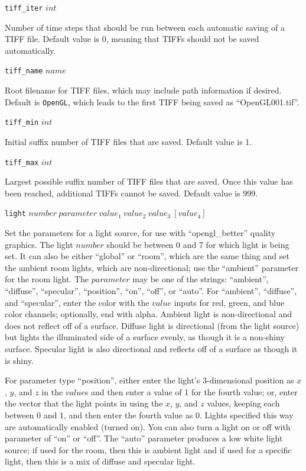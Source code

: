 \documentclass {scrbook}
\newcommand {\ttt} {\texttt}
\begin{document}
\begin{description}
\item{\ttt{tiff\_iter} $int$}

Number of time steps that should be run between each automatic saving of a TIFF file. Default value is 0, meaning that TIFFs should not be saved automatically.

\item{\ttt{tiff\_name} $name$}

Root filename for TIFF files, which may include path information if desired. Default is \ttt{OpenGL}, which leads to the first TIFF being saved as ``OpenGL001.tif''.

\item{\ttt{tiff\_min} $int$}

Initial suffix number of TIFF files that are saved. Default value is 1.

\item{\ttt{tiff\_max} $int$}

Largest possible suffix number of TIFF files that are saved. Once this value has been reached, additional TIFFs cannot be saved. Default value is 999.

\item{\ttt{light} $number\ parameter\ value_1\ value_2\ value_3\ [value_4]$}

Set the parameters for a light source, for use with ``opengl\_better'' quality graphics. The light $number$ should be between 0 and 7 for which light is being set. It can also be either ``global'' or ``room'', which are the same thing and set the ambient room lights, which are non-directional; use the ``ambient'' parameter for the room light. The $parameter$ may be one of the strings: ``ambient'', ``diffuse'', ``specular'', ``position'', ``on'', ``off'', or ``auto''. For ``ambient'', ``diffuse'', and ``specular'', enter the color with the $value$ inputs for red, green, and blue color channels; optionally, end with alpha. Ambient light is non-directional and does not reflect off of a surface. Diffuse light is directional (from the light source) but lights the illuminated side of a surface evenly, as though it is a non-shiny surface. Specular light is also directional and reflects off of a surface as though it is shiny.

For parameter type ``position'', either enter the light's 3-dimensional position as $x$, $y$, and $z$ in the $value$s and then enter a value of 1 for the fourth value; or, enter the vector that the light points in using the $x$, $y$, and $z$ values, keeping each between 0 and 1, and then enter the fourth value as 0. Lights specified this way are automatically enabled (turned on). You can also turn a light on or off with parameter of ``on'' or ``off''. The ``auto'' parameter produces a low white light source; if used for the room, then this is ambient light and if used for a specific light, then this is a mix of diffuse and specular light.


\end{description}
\end{document}
